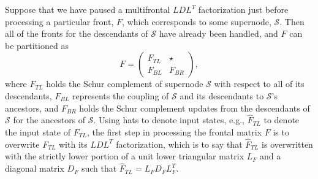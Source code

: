 Suppose that we have paused a multifrontal $LDL^T$ factorization just before
processing a particular front, $F$, which corresponds to some supernode, 
$\mathcal{S}$. Then all of the fronts for the descendants of $\mathcal{S}$ 
have already been handled, and $F$ can be partitioned as
\begin{equation}
  F = \left(\begin{array}{cc} F_{TL} & \star \\ 
                              F_{BL} & F_{BR}\end{array}\right),
\end{equation}
where $F_{TL}$ holds the Schur complement of supernode $\mathcal{S}$ with 
respect to all of its descendants, $F_{BL}$ 
represents the coupling of $\mathcal{S}$ and its descendants to $\mathcal{S}$'s
ancestors, and $F_{BR}$ holds the Schur complement updates from 
the descendants of $\mathcal{S}$ for the ancestors of $\mathcal{S}$. Using 
hats to denote input states, e.g., $\hat F_{TL}$ to denote the input state
of $F_{TL}$, the first step in processing the frontal matrix $F$ is to 
overwrite $F_{TL}$ with its $LDL^T$ factorization, which is to say that 
$\hat F_{TL}$ is overwritten with the strictly lower portion of a unit lower 
triangular matrix $L_F$ and a diagonal matrix $D_F$ such that 
$\hat F_{TL} = L_F D_F L_F^T$. 

